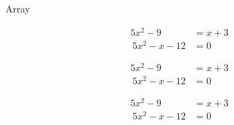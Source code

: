 \documentclass[12pt]{article}
\begin{document}
Array

\begin{align}
5x^2-9&=x+3\\\
5x^2-x-12&=0
\end{align}

\begin{align*}
5x^2-9&=x+3\\\
5x^2-x-12&=0
\end{align*}

\begin{align}
5x^2-9&=x+3\\\
5x^2-x-12&=0
\end{align}
\end{document}

